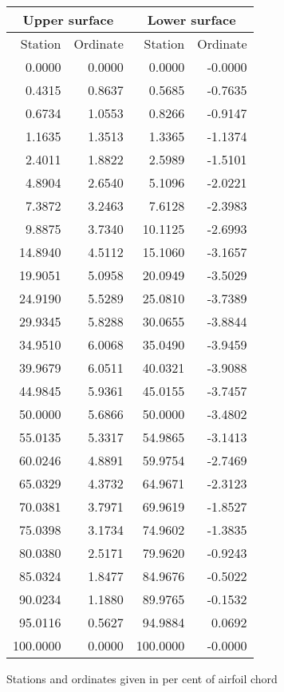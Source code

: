 \documentclass[11pt]{book}
\begin{document}
 \hspace{4mm}
 \begin{tabular}{|r|r|r|r|} \hline 
 \multicolumn{2}{|c|}{Upper surface} & \multicolumn{2}{|c|}{Lower surface} \\
 \hline
 Station & Ordinate & Station & Ordinate \\
 \hline
0.0000 & 0.0000 & 0.0000 & -0.0000 \\
0.4315 & 0.8637 & 0.5685 & -0.7635 \\
0.6734 & 1.0553 & 0.8266 & -0.9147 \\
1.1635 & 1.3513 & 1.3365 & -1.1374 \\
2.4011 & 1.8822 & 2.5989 & -1.5101 \\
4.8904 & 2.6540 & 5.1096 & -2.0221 \\
7.3872 & 3.2463 & 7.6128 & -2.3983 \\
9.8875 & 3.7340 & 10.1125 & -2.6993 \\
14.8940 & 4.5112 & 15.1060 & -3.1657 \\
19.9051 & 5.0958 & 20.0949 & -3.5029 \\
24.9190 & 5.5289 & 25.0810 & -3.7389 \\
29.9345 & 5.8288 & 30.0655 & -3.8844 \\
34.9510 & 6.0068 & 35.0490 & -3.9459 \\
39.9679 & 6.0511 & 40.0321 & -3.9088 \\
44.9845 & 5.9361 & 45.0155 & -3.7457 \\
50.0000 & 5.6866 & 50.0000 & -3.4802 \\
55.0135 & 5.3317 & 54.9865 & -3.1413 \\
60.0246 & 4.8891 & 59.9754 & -2.7469 \\
65.0329 & 4.3732 & 64.9671 & -2.3123 \\
70.0381 & 3.7971 & 69.9619 & -1.8527 \\
75.0398 & 3.1734 & 74.9602 & -1.3835 \\
80.0380 & 2.5171 & 79.9620 & -0.9243 \\
85.0324 & 1.8477 & 84.9676 & -0.5022 \\
90.0234 & 1.1880 & 89.9765 & -0.1532 \\
95.0116 & 0.5627 & 94.9884 & 0.0692 \\
100.0000 & 0.0000 & 100.0000 & -0.0000 \\
 \hline 
 \end{tabular}
 \vspace{8mm}

Stations and ordinates given in per cent of airfoil chord
\end{document}
